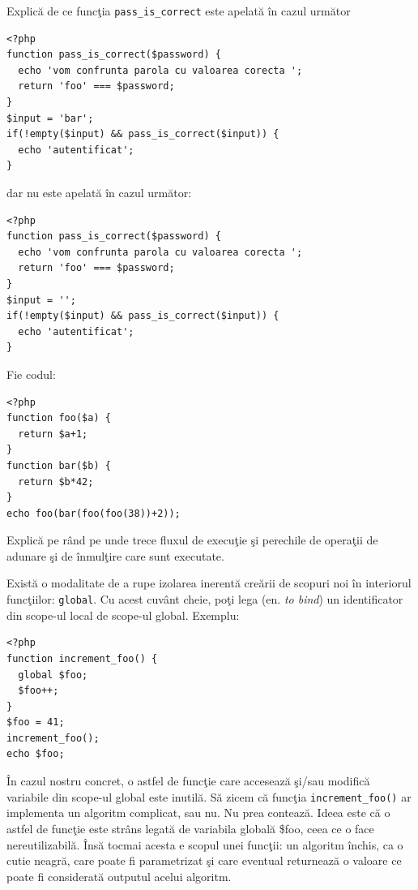 \begin{Exercise}[title={Execuţia liniară nu conţine mereu toate verificările dintr-o condiţie},difficulty=2]
Explică de ce funcţia \texttt{pass\_is\_correct} este apelată
în cazul următor
\begin{lstlisting}
<?php
function pass_is_correct($password) {
  echo 'vom confrunta parola cu valoarea corecta ';
  return 'foo' === $password;
}
$input = 'bar';
if(!empty($input) && pass_is_correct($input)) {
  echo 'autentificat';
}
\end{lstlisting}
dar nu este apelată în cazul următor:
\begin{lstlisting}
<?php
function pass_is_correct($password) {
  echo 'vom confrunta parola cu valoarea corecta ';
  return 'foo' === $password;
}
$input = '';
if(!empty($input) && pass_is_correct($input)) {
  echo 'autentificat';
}
\end{lstlisting}
\end{Exercise}

\begin{Exercise}[title={Fluxul de execuţie şi apeluri nested la funcţii},difficulty=1]
Fie codul:
\begin{lstlisting}
<?php
function foo($a) {
  return $a+1;
}
function bar($b) {
  return $b*42;
}
echo foo(bar(foo(foo(38))+2));
\end{lstlisting}
Explică pe rând pe unde trece fluxul de execuţie şi perechile de operaţii
de adunare şi de înmulţire care sunt executate.
\end{Exercise}

Există o modalitate de a rupe izolarea inerentă creării de scopuri noi
în interiorul funcţiilor: \texttt{global}. Cu acest cuvânt cheie,
poţi lega (en. \textsl{to bind}) un identificator din scope-ul local
de scope-ul global. Exemplu:
\begin{lstlisting}
<?php
function increment_foo() {
  global $foo;
  $foo++;
}
$foo = 41;
increment_foo();
echo $foo;
\end{lstlisting}

În cazul nostru concret, o astfel de funcţie care accesează şi/sau modifică
variabile din scope-ul global este inutilă. Să zicem că funcţia
\texttt{increment\_foo()} ar implementa un algoritm complicat, sau nu. Nu
prea contează. Ideea este că o astfel de funcţie este strâns legată
de variabila globală \$foo, ceea ce o face nereutilizabilă. Însă
tocmai acesta e scopul unei funcţii: un algoritm închis,
ca o cutie neagră, care poate
fi parametrizat şi care eventual returnează o valoare ce poate
fi considerată outputul acelui algoritm.

